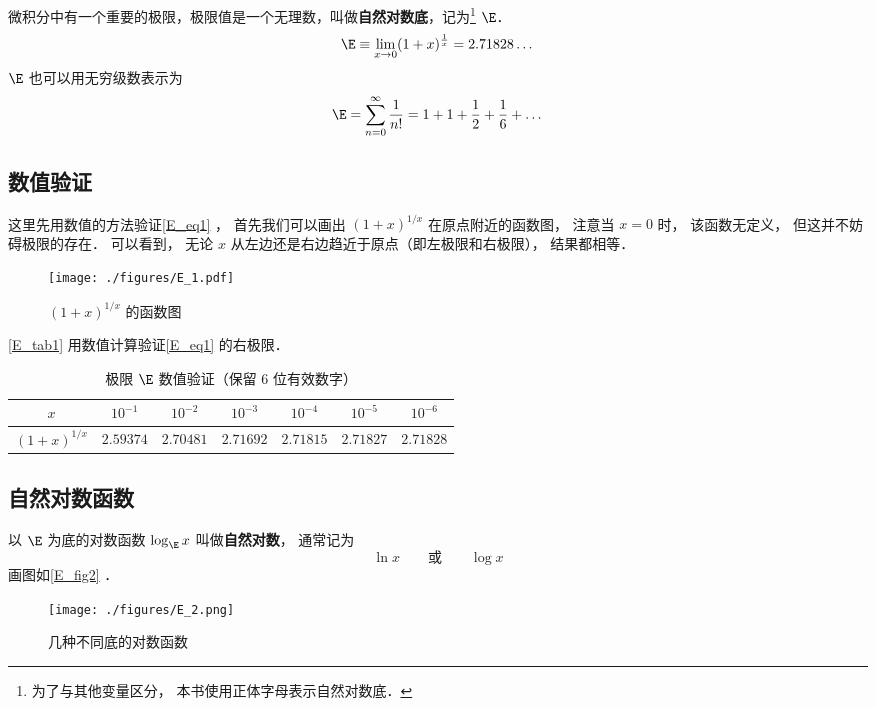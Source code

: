 
微积分中有一个重要的极限，极限值是一个无理数，叫做\textbf{自然对数底}，记为\footnote{为了与其他变量区分， 本书使用正体字母表示自然对数底．} $\E$．
\begin{equation}\label{E_eq1}
\E \equiv \lim_{x \to 0} (1 + x)^{\frac{1}{x}} = 2.71828\dots
\end{equation}
$\E$ 也可以用无穷级数表示为%
\begin{equation}\label{E_eq2}
\E = \sum_{n=0}^\infty \frac{1}{n!} = 1 + 1 + \frac{1}{2} + \frac{1}{6} + \dots
\end{equation}

\subsection{数值验证}
这里先用数值的方法验证\autoref{E_eq1} ， 首先我们可以画出 $(1+x)^{1/x}$ 在原点附近的函数图， 注意当 $x = 0$ 时， 该函数无定义， 但这并不妨碍极限的存在． 可以看到， 无论 $x$ 从左边还是右边趋近于原点（即左极限和右极限）， 结果都相等．
\begin{figure}[ht]
\centering
\texttt{[image: ./figures/E\_1.pdf]}
\caption{$(1+x)^{1/x}$ 的函数图} \label{E_fig1}
\end{figure}

\autoref{E_tab1} 用数值计算验证\autoref{E_eq1} 的右极限．
\begin{table}[ht]
\centering
\caption{极限 $\E$ 数值验证（保留 6 位有效数字）}\label{E_tab1}
\begin{tabular}{|c|c|c|c|c|c|c|}
\hline
$x$ & $10^{-1}$ & $10^{-2}$ & $10^{-3}$ & $10^{-4}$ & $10^{-5}$ & $10^{-6}$ \\
\hline
$(1 + x)^{1/x}$ & $2.59374$ & $2.70481$ & $2.71692$ & $2.71815$ & $2.71827$ & $2.71828$ \\
\hline
\end{tabular}
\end{table}

\subsection{自然对数函数}
以 $\E$ 为底的对数函数 $\log_{\E} x$ 叫做\textbf{自然对数}， 通常记为
\begin{equation}
\ln x \qquad \text{或} \qquad \log x
\end{equation}
画图如\autoref{E_fig2} ．
\begin{figure}[ht]
\centering
\texttt{[image: ./figures/E\_2.png]}
\caption{几种不同底的对数函数} \label{E_fig2}
\end{figure}
